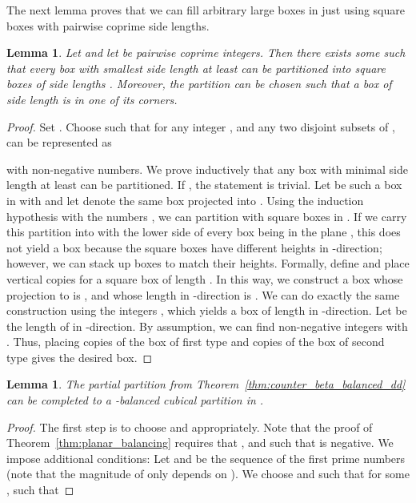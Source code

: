 \documentclass[12pt]{article}
\newtheorem{lemma}[theorem]{Lemma}
\begin{document}
\begin{appendix}
The next lemma proves that we can fill arbitrary
large boxes in  just using square boxes with  pairwise coprime side lengths.

\begin{lemma}\label{lem:square_filling}
Let  and let  be pairwise coprime integers.
Then there exists some  such that every box with smallest side length at least 
can be partitioned into square boxes of side lengths . Moreover, the partition
can be chosen such that a box of side length  is in one of its corners.
\end{lemma}
\begin{proof}
Set .
Choose  such that for any integer , and any two
disjoint subsets  of , 
 can be represented as 

with  non-negative numbers.
We prove inductively that any box with minimal side length at least 
can be partitioned. If , the statement is trivial.
Let  be such a box in  with  
and let  denote the same
box projected into . Using the induction hypothesis with the numbers
, we can partition  with square boxes in .
If we carry this partition into  with the lower side of every box being in
the plane , this does not yield a box because
the square boxes have different heights in -direction; however, we can stack up
boxes to match their heights. Formally, define 
and place  vertical copies for a square box of length . In this way,
we construct a box whose projection to  is , and whose length
in -direction is .
We can do exactly the same construction using the integers ,
which yields a box of length  in -direction.
Let  be the length of  in -direction.
By assumption, we can find non-negative integers  with
.
Thus, placing  copies of the box of first type and  copies
of the box of second type gives the desired box.
\end{proof}

\begin{lemma}
The partial partition  from Theorem~\ref{thm:counter_beta_balanced_dd} can be completed
to a -balanced cubical partition in .
\end{lemma}

\begin{proof}

The first step is to choose  and  appropriately. Note that the proof of 
Theorem~\ref{thm:planar_balancing} requires that ,
and such that  is negative. 
We impose additional conditions:
Let  and  be the sequence of the first  prime numbers
(note that the magnitude of  only depends on ).
We choose  and  such that 
 for some , such that


\end{proof}
\end{appendix}
\end{document}
